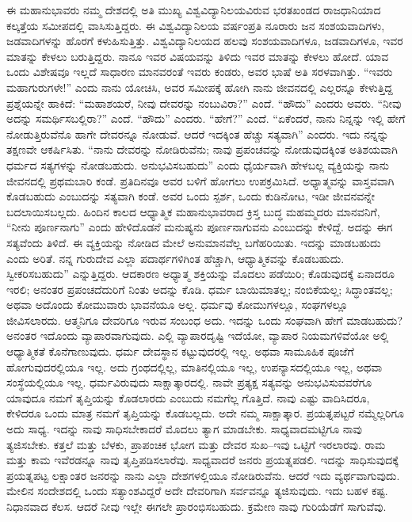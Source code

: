 ಈ ಮಹಾನುಭಾವರು ನಮ್ಮ ದೇಶದಲ್ಲಿ ಅತಿ ಮುಖ್ಯ ವಿಶ್ವವಿದ್ಯಾನಿಲಯವಿರುವ ಭರತಖಂಡದ ರಾಜಧಾನಿಯಾದ ಕಲ್ಕತ್ತೆಯ ಸಮೀಪದಲ್ಲಿ ವಾಸಿಸುತ್ತಿದ್ದರು. ಈ ವಿಶ್ವವಿದ್ಯಾನಿಲಯ ವರ್ಷಂಪ್ರತಿ ನೂರಾರು ಜನ ಸಂಶಯವಾದಿಗಳು, ಜಡವಾದಿಗಳನ್ನು ಹೊರಗೆ ಕಳುಹಿಸುತ್ತಿತ್ತು. ವಿಶ್ವವಿದ್ಯಾನಿಲಯದ ಹಲವು ಸಂಶಯವಾದಿಗಳೂ, ಜಡವಾದಿಗಳೂ, ಇವರ ಮಾತನ್ನು ಕೇಳಲು ಬರುತ್ತಿದ್ದರು. ನಾನೂ ಇವರ ವಿಷಯವನ್ನು ತಿಳಿದು ಇವರ ಮಾತನ್ನು ಕೇಳಲು ಹೋದೆ. ಯಾವ ಒಂದು ವಿಶೇಷವೂ ಇಲ್ಲದೆ ಸಾಧಾರಣ ಮಾನವರಂತೆ ಇವರು ಕಂಡರು, ಅವರ ಭಾಷೆ ಅತಿ ಸರಳವಾಗಿತ್ತು. “ಇವರು ಮಹಾಗುರುಗಳೇ!” ಎಂದು ನಾನು ಯೋಚಿಸಿ, ಅವರ ಸಮೀಪಕ್ಕೆ ಹೋಗಿ ನಾನು ಜೀವನದಲ್ಲಿ ಎಲ್ಲರನ್ನೂ ಕೇಳುತ್ತಿದ್ದ ಪ್ರಶ್ನೆಯನ್ನೇ ಹಾಕಿದೆ: “ಮಹಾಶಯರೆ, ನೀವು ದೇವರನ್ನು ನಂಬುವಿರಾ?” ಎಂದೆ. “ಹೌದು” ಎಂದರು ಅವರು. “ನೀವು ಅದನ್ನು ಸಮರ್ಥಿಸಬಲ್ಲಿರಾ?” ಎಂದೆ. “ಹೌದು” ಎಂದರು. “ಹೇಗೆ?” ಎಂದೆ. “ಏಕೆಂದರೆ, ನಾನು ನಿನ್ನನ್ನು ಇಲ್ಲಿ ಹೇಗೆ ನೋಡುತ್ತಿರುವೆನೊ ಹಾಗೇ ದೇವರನ್ನೂ ನೋಡುವೆ. ಆದರೆ ಇದಕ್ಕಿಂತ ಹೆಚ್ಚು ಸತ್ಯವಾಗಿ” ಎಂದರು. ಇದು ನನ್ನನ್ನು ತಕ್ಷಣವೇ ಆಕರ್ಷಿಸಿತು. “ನಾನು ದೇವರನ್ನು ನೋಡಿರುವೆನು; ನಾವು ಪ್ರಪಂಚವನ್ನು ನೋಡುವುದಕ್ಕಿಂತ ಅತಿಶಯವಾಗಿ ಧರ್ಮದ ಸತ್ಯಗಳನ್ನು ನೋಡಬಹುದು. ಅನುಭವಿಸಬಹುದು” ಎಂದು ಧೈರ್ಯವಾಗಿ ಹೇಳಬಲ್ಲ ವ್ಯಕ್ತಿಯನ್ನು ನಾನು ಜೀವನದಲ್ಲಿ ಪ್ರಥಮಬಾರಿ ಕಂಡೆ. ಪ್ರತಿದಿನವೂ ಅವರ ಬಳಿಗೆ ಹೋಗಲು ಉಪಕ್ರಮಿಸಿದೆ. ಅಧ್ಯಾತ್ಮವನ್ನು ವಾಸ್ತವವಾಗಿ ಕೊಡಬಹುದು ಎಂಬುದನ್ನು ಸತ್ಯವಾಗಿ ಕಂಡೆ. ಅವರ ಒಂದು ಸ್ಪರ್ಶ, ಒಂದು ಕುಡಿನೋಟ, ಇಡೀ ಜೀವನವನ್ನೇ ಬದಲಾಯಿಸಬಲ್ಲದು. ಹಿಂದಿನ ಕಾಲದ ಆಧ್ಯಾತ್ಮಿಕ ಮಹಾನುಭಾವರಾದ ಕ್ರಿಸ್ತ ಬುದ್ಧ ಮಹಮ್ಮದರು ಮಾನವನಿಗೆ, “ನೀನು ಪೂರ್ಣನಾಗು” ಎಂದು ಹೇಳಿದೊಡನೆ ಮನುಷ್ಯನು ಪೂರ್ಣನಾಗುವನು ಎಂಬುದನ್ನು ಕೇಳಿದ್ದೆ. ಅದನ್ನು ಈಗ ಸತ್ಯವೆಂದು ತಿಳಿದೆ. ಈ ವ್ಯಕ್ತಿಯನ್ನು ನೋಡಿದ ಮೇಲೆ ಅನುಮಾನವೆಲ್ಲ ಬಗೆಹರಿಯಿತು. ಇದನ್ನು ಮಾಡಬಹುದು ಎಂದು ಅರಿತೆ. ನನ್ನ ಗುರುದೇವ ಎಲ್ಲಾ ಪದಾರ್ಥಗಳಿಗಿಂತ ಹೆಚ್ಚಾಗಿ, ಆಧ್ಯಾತ್ಮಿಕವನ್ನು ಕೊಡಬಹುದು. ಸ್ವೀಕರಿಸಬಹುದು” ಎನ್ನುತ್ತಿದ್ದರು. ಆದಕಾರಣ ಅಧ್ಯಾತ್ಮ ಶಕ್ತಿಯನ್ನು ಮೊದಲು ಪಡೆಯಿರಿ; ಕೊಡುವುದಕ್ಕೆ ಏನಾದರೂ ಇರಲಿ; ಅನಂತರ ಪ್ರಪಂಚದೆದುರಿಗೆ ನಿಂತು ಅದನ್ನು ಕೊಡಿ. ಧರ್ಮ ಬಾಯಿಮಾತಲ್ಲ; ನಂಬಿಕೆಯಲ್ಲ; ಸಿದ್ಧಾಂತವಲ್ಲ; ಅಥವಾ ಅದೊಂದು ಕೋಮುವಾರು ಭಾವನೆಯೂ ಅಲ್ಲ. ಧರ್ಮವು ಕೋಮುಗಳಲ್ಲೂ, ಸಂಘಗಳಲ್ಲೂ ಜೀವಿಸಲಾರದು. ಆತ್ಮನಿಗೂ ದೇವರಿಗೂ ಇರುವ ಸಂಬಂಧ ಅದು. ಇದನ್ನು ಒಂದು ಸಂಘವಾಗಿ ಹೇಗೆ ಮಾಡಬಹುದು? ಅನಂತರ ಇದೊಂದು ವ್ಯಾಪಾರವಾಗುವುದು. ಎಲ್ಲಿ ವ್ಯಾಪಾರದೃಷ್ಟಿ ಇದೆಯೋ, ವ್ಯಾಪಾರ ನಿಯಮಗಳಿವೆಯೋ ಅಲ್ಲಿ ಆಧ್ಯಾತ್ಮಿಕತೆ ಕೊನೆಗಾಣುವುದು. ಧರ್ಮ ದೇವಸ್ಥಾನ ಕಟ್ಟುವುದರಲ್ಲಿ ಇಲ್ಲ. ಅಥವಾ ಸಾಮೂಹಿಕ ಪೂಜೆಗೆ ಹೋಗುವುದರಲ್ಲಿಯೂ ಇಲ್ಲ. ಅದು ಗ್ರಂಥದಲ್ಲಿಲ್ಲ, ಮಾತಿನಲ್ಲಿಯೂ ಇಲ್ಲ, ಉಪನ್ಯಾಸದಲ್ಲಿಯೂ ಇಲ್ಲ, ಅಥವಾ ಸಂಸ್ಥೆಯಲ್ಲಿಯೂ ಇಲ್ಲ. ಧರ್ಮವಿರುವುದು ಸಾಕ್ಷಾತ್ಕಾರದಲ್ಲಿ. ನಾವೇ ಪ್ರತ್ಯಕ್ಷ ಸತ್ಯವನ್ನು ಅನುಭವಿಸುವವರೆಗೂ ಯಾವುದೂ ನಮಗೆ ತೃಪ್ತಿಯನ್ನು ಕೊಡಲಾರದು ಎಂಬುದು ನಮಗೆಲ್ಲ ಗೊತ್ತಿದೆ. ನಾವು ಎಷ್ಟು ವಾದಿಸಿದರೂ, ಕೇಳಿದರೂ ಒಂದು ಮಾತ್ರ ನಮಗೆ ತೃಪ್ತಿಯನ್ನು ಕೊಡಬಲ್ಲದು. ಅದೇ ನಮ್ಮ ಸಾಕ್ಷಾತ್ಕಾರ. ಪ್ರಯತ್ನಪಟ್ಟರೆ ನಮ್ಮೆಲ್ಲರಿಗೂ ಅದು ಸಾಧ್ಯ. ಇದನ್ನು ನಾವು ಸಾಧಿಸಬೇಕಾದರೆ ಮೊದಲು ತ್ಯಾಗ ಮಾಡಬೇಕು. ಸಾಧ್ಯವಾದಮಟ್ಟಿಗೂ ನಾವು ತ್ಯಜಿಸಬೇಕು. ಕತ್ತಲೆ ಮತ್ತು ಬೆಳಕು, ಪ್ರಾಪಂಚಿಕ ಭೋಗ ಮತ್ತು ದೇವರ ಸುಖ–ಇವು ಒಟ್ಟಿಗೆ ಇರಲಾರವು. ರಾಮ ಮತ್ತು ಕಾಮ ಇವೆರಡನ್ನೂ ನಾವು ತೃಪ್ತಿಪಡಿಸಲಾರೆವು. ಸಾಧ್ಯವಾದರೆ ಜನರು ಪ್ರಯತ್ನಪಡಲಿ. ಇದನ್ನು ಸಾಧಿಸುವುದಕ್ಕೆ ಪ್ರಯತ್ನಪಟ್ಟ ಲಕ್ಷಾಂತರ ಜನರನ್ನು ನಾನು ಎಲ್ಲಾ ದೇಶಗಳಲ್ಲಿಯೂ ನೋಡಿರುವೆನು. ಆದರೆ ಇದು ವ್ಯರ್ಥವಾಗುವುದು. ಮೇಲಿನ ಸಂದೇಶದಲ್ಲಿ ಒಂದು ಸತ್ಯಾಂಶವಿದ್ದರೆ ಅದೇ ದೇವರಿಗಾಗಿ ಸರ್ವವನ್ನೂ ತ್ಯಜಿಸುವುದು. ಇದು ಬಹಳ ಕಷ್ಟ. ನಿಧಾನವಾದ ಕೆಲಸ. ಆದರೆ ನೀವು ಇಲ್ಲೇ ಈಗಲೇ ಪ್ರಾರಂಭಿಸಬಹುದು. ಕ್ರಮೇಣ ನಾವು ಗುರಿಯೆಡೆಗೆ ಸಾಗುವೆವು.

